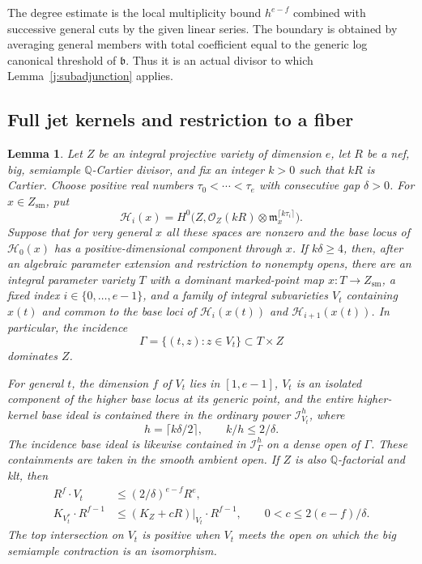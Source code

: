 \documentclass[12pt,a4paper,psamsfonts]{amsart}
\theoremstyle{definition}
\theoremstyle{plain}
\newtheorem{lemma}{Lemma}[section]
\newcommand{\Q}{\mathbb Q}
\newcommand{\OO}{\mathcal O}
\begin{document}
The degree estimate is the local multiplicity bound $h^{e-f}$
combined with successive general cuts by the given linear series.
The boundary is obtained by averaging general members with total
coefficient equal to the generic log canonical threshold of
$\mathfrak b$.  Thus it is an actual divisor to which
Lemma~\ref{j:subadjunction} applies.

\subsection{Full jet kernels and restriction to a fiber}

\begin{lemma}
\label{j:moving-kernel}
Let $Z$ be an integral projective variety of dimension $e$, let
$R$ be a nef, big, semiample $\mathbb{Q}$-Cartier divisor, and fix
an integer $k>0$ such that $kR$ is Cartier.  Choose positive real
numbers $\tau_0<\cdots<\tau_e$ with consecutive gap $\delta>0$.
For $x\in Z_{\mathrm{sm}}$, put
\[
 \mathcal H_i(x)=H^0\bigl(Z,\OO_Z(kR)
                  \otimes\mathfrak m_x^{\lceil k\tau_i\rceil}\bigr).
\]
Suppose that for very general $x$ all these spaces are nonzero and
the base locus of $\mathcal H_0(x)$ has a positive-dimensional
component through $x$.  If $k\delta\geq4$, then, after an
algebraic parameter extension and restriction to nonempty opens,
there are an integral parameter variety $T$ with a dominant
marked-point map $x:T\to Z_{\mathrm{sm}}$, a fixed index
$i\in\{0,\ldots,e-1\}$, and a family of integral subvarieties
$V_t$ containing $x(t)$ and common to the base loci of
$\mathcal H_i(x(t))$ and $\mathcal H_{i+1}(x(t))$.  In particular,
the incidence
\[
 \Gamma=\{(t,z):z\in V_t\}\subset T\times Z
\]
dominates $Z$.

For general $t$, the dimension $f$ of $V_t$ lies in $[1,e-1]$,
$V_t$ is an isolated component of the higher base locus at its
generic point, and the entire higher-kernel base ideal is
contained there in the ordinary power $\mathcal I_{V_t}^h$, where
\[
 h=\lceil k\delta/2\rceil,\qquad k/h\leq2/\delta.
\]
The incidence base ideal is likewise contained in
$\mathcal I_\Gamma^h$ on a dense open of $\Gamma$.
These containments are taken in the smooth ambient open.
If $Z$ is also $\Q$-factorial and klt, then
\begin{equation}
\label{j:moving-bounds}
 \begin{split}
 R^f\cdot V_t&\leq(2/\delta)^{e-f}R^e,\\
 K_{V_t^*}\cdot R^{f-1}
   &\leq(K_Z+cR)|_{V_t}\cdot R^{f-1},
       \qquad 0<c\leq2(e-f)/\delta.
 \end{split}
\end{equation}
The top intersection on $V_t$ is positive when $V_t$ meets the
open on which the big semiample contraction is an isomorphism.
\end{lemma}
\end{document}
